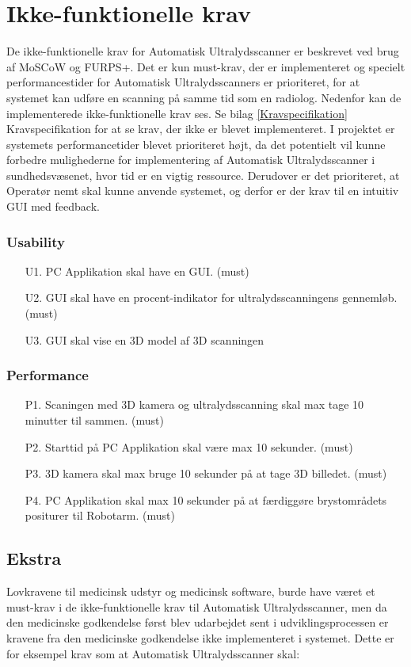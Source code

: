 \section{Ikke-funktionelle krav}
De ikke-funktionelle krav for Automatisk Ultralydsscanner er beskrevet ved brug af MoSCoW og FURPS+. Det er kun must-krav, der er implementeret og specielt performancestider for Automatisk Ultralydsscanners er prioriteret, for at systemet kan udføre en scanning på samme tid som en radiolog. Nedenfor kan de implementerede ikke-funktionelle krav ses. Se bilag \ref{Kravspecifikation} Kravspecifikation for at se krav, der ikke er blevet implementeret. 
I projektet er systemets performancetider blevet prioriteret højt, da det potentielt vil kunne forbedre mulighederne for implementering af Automatisk Ultralydsscanner i sundhedsvæsenet, hvor tid er en vigtig ressource. Derudover er det prioriteret, at Operatør nemt skal kunne anvende systemet, og derfor er der krav til en intuitiv GUI med feedback.

\subsubsection{Usability}
\begin{itemize}
    \item[U1.] PC Applikation skal have en GUI. (must)
    \item[U2.] GUI skal have en procent-indikator for ultralydsscanningens gennemløb. (must)
	\item[U3.] GUI skal vise en 3D model af 3D scanningen
\end{itemize}

\subsubsection{Performance}
\begin{itemize}
    \item[P1.] Scaningen med 3D kamera og ultralydsscanning skal max tage 10 minutter til sammen. (must) 
    \item[P2.] Starttid på PC Applikation skal være max 10 sekunder. (must)
    \item[P3.] 3D kamera skal max bruge 10 sekunder på at tage 3D billedet. (must)
    \item[P4.] PC Applikation skal max 10 sekunder på at færdiggøre brystområdets positurer til Robotarm. (must)
\end{itemize}

\subsection{Ekstra}
Lovkravene til medicinsk udstyr og medicinsk software, burde have været et must-krav i de ikke-funktionelle krav til Automatisk Ultralydsscanner, men da den medicinske godkendelse først blev udarbejdet sent i udviklingsprocessen er kravene fra den medicinske godkendelse ikke implementeret i systemet. Dette er for eksempel krav som at Automatisk Ultralydsscanner skal: 


